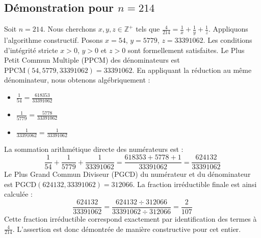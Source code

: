 \documentclass[11pt,a4paper]{article}
\begin{document}
\subsection{Démonstration pour $n = 214$}
Soit $n = 214$. Nous cherchons $x, y, z \in \mathbb{Z}^{+}$ tels que $\frac{4}{214} = \frac{1}{x} + \frac{1}{y} + \frac{1}{z}$.
Appliquons l'algorithme constructif. Posons $x = 54$, $y = 5779$, $z = 33391062$.
Les conditions d'intégrité stricte $x > 0$, $y > 0$ et $z > 0$ sont formellement satisfaites.
Le Plus Petit Commun Multiple (PPCM) des dénominateurs est $\text{PPCM}(54, 5779, 33391062) = 33391062$.
En appliquant la réduction au même dénominateur, nous obtenons algébriquement :
\begin{itemize}
    \item $\frac{1}{54} = \frac{618353}{33391062}$
    \item $\frac{1}{5779} = \frac{5778}{33391062}$
    \item $\frac{1}{33391062} = \frac{1}{33391062}$
\end{itemize}
La sommation arithmétique directe des numérateurs est :
$$ \frac{1}{54} + \frac{1}{5779} + \frac{1}{33391062} = \frac{618353 + 5778 + 1}{33391062} = \frac{624132}{33391062} $$
Le Plus Grand Commun Diviseur (PGCD) du numérateur et du dénominateur est $\text{PGCD}(624132, 33391062) = 312066$.
La fraction irréductible finale est ainsi calculée :
$$ \frac{624132}{33391062} = \frac{624132 \div 312066}{33391062 \div 312066} = \frac{2}{107} $$
Cette fraction irréductible correspond exactement par identification des termes à $\frac{4}{214}$. L'assertion est donc démontrée de manière constructive pour cet entier.
\end{document}
